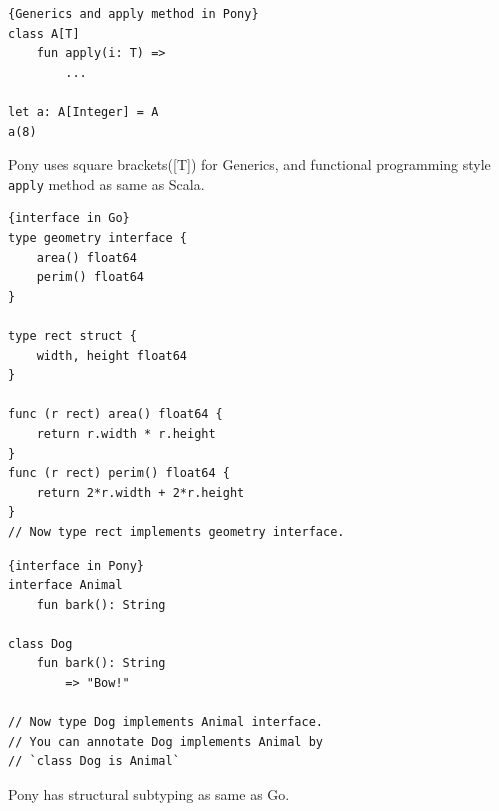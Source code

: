 \documentclass{article}
\begin{document}
\begin{multicols}{2}
\begin{lstlisting}{Generics and apply method in Pony}
class A[T]
	fun apply(i: T) =>
		...
	
let a: A[Integer] = A
a(8)	
\end{lstlisting}

Pony uses square brackets([T]) for Generics, and functional programming style \texttt{apply} method as same as Scala. \\


\begin{lstlisting}{interface in Go}
type geometry interface {
    area() float64
    perim() float64
}

type rect struct {
    width, height float64
}

func (r rect) area() float64 {
    return r.width * r.height
}
func (r rect) perim() float64 {
    return 2*r.width + 2*r.height
}
// Now type rect implements geometry interface.

\end{lstlisting}

\begin{lstlisting}{interface in Pony}
interface Animal
	fun bark(): String
	
class Dog
	fun bark(): String
		=> "Bow!"	
	
// Now type Dog implements Animal interface.
// You can annotate Dog implements Animal by 
// `class Dog is Animal`
\end{lstlisting}
 
Pony has structural subtyping as same as Go. \\



\end{multicols}
\end{document}
